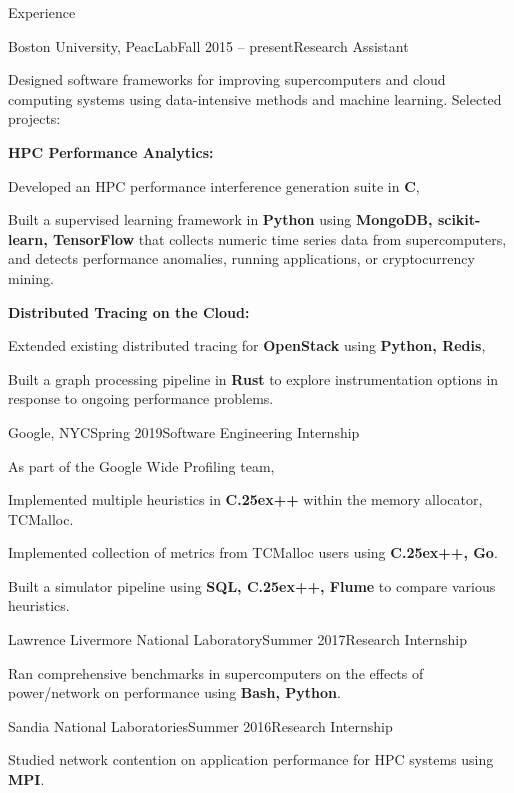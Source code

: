 \documentclass{resume}
\def\bfCplusplus{{\rm{\bf C\raise.25ex\hbox{\small ++}}}}
\begin{document}
\begin{rSection}{Experience}

\begin{rWorksection}{Boston University, PeacLab}{Fall 2015 -- present}{Research Assistant}
\item Designed software frameworks for improving supercomputers and cloud
  computing systems using data-intensive methods and machine learning. Selected
  projects:
\item {\bf HPC Performance Analytics:}
  \begin{rList}
  \item Developed an HPC performance interference generation suite in {\bf C},
  \item Built a supervised learning framework in {\bf Python} using {\bf
      MongoDB, scikit-learn, TensorFlow} that collects numeric time series data
    from supercomputers, and detects performance anomalies, running
    applications, or cryptocurrency mining.
  \end{rList}
\item {\bf Distributed Tracing on the Cloud:}
  \begin{rList}
  \item Extended existing distributed tracing for {\bf OpenStack} using {\bf
      Python, Redis},
  \item Built a graph processing pipeline in {\bf Rust} to explore
    instrumentation options in response to ongoing performance problems.
  \end{rList}
\end{rWorksection}

\begin{rWorksection}{Google, NYC}{Spring 2019}{Software Engineering
    Internship}
\item As part of the Google Wide Profiling team,
  \begin{rList}
  \item Implemented multiple heuristics in {\bf \bfCplusplus{}} within the memory
    allocator, TCMalloc.
  \item Implemented collection of metrics from TCMalloc users using {\bf
      \bfCplusplus{}, Go}.
  \item Built a simulator pipeline using {\bf SQL, \bfCplusplus{}, Flume} to
    compare various heuristics.
  \end{rList}
\end{rWorksection}

\begin{rWorksection}{Lawrence Livermore National Laboratory}{Summer
    2017}{Research Internship}
\item Ran comprehensive benchmarks in supercomputers on the effects of
  power/network on performance using {\bf Bash, Python}.
\end{rWorksection}

\begin{rWorksection}{Sandia National Laboratories}{Summer 2016}{Research
    Internship}
\item Studied network contention on application performance for HPC systems
  using {\bf MPI}.
\end{rWorksection}

\end{rSection}
\end{document}
